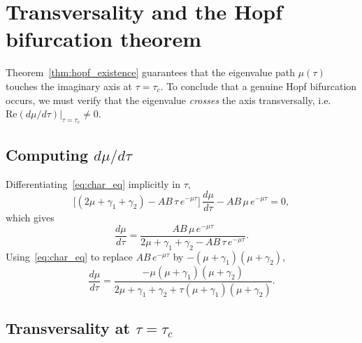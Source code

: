 \documentclass[sn-mathphys,Numbered]{sn-jnl}
\theoremstyle{thmstyleone}
\theoremstyle{thmstyletwo}
\theoremstyle{thmstylethree}
\begin{document}
\section{Transversality and the Hopf bifurcation theorem}
\label{sec:transversality}

Theorem~\ref{thm:hopf_existence} guarantees that the eigenvalue path
$\mu(\tau)$ touches the imaginary axis at $\tau=\tau_c$. To conclude that a
genuine Hopf bifurcation occurs, we must verify that the eigenvalue
\emph{crosses} the axis transversally, i.e.\
$\mathrm{Re}(d\mu/d\tau)|_{\tau=\tau_c}\neq 0$.

\subsection{Computing $d\mu/d\tau$}

Differentiating~\eqref{eq:char_eq} implicitly in $\tau$,
\[
\bigl[(2\mu+\gamma_1+\gamma_2) - AB\,\tau\,e^{-\mu\tau}\bigr]\,\frac{d\mu}{d\tau}
- AB\,\mu\,e^{-\mu\tau} = 0,
\]
which gives
\[
\frac{d\mu}{d\tau}
= \frac{AB\,\mu\,e^{-\mu\tau}}{2\mu+\gamma_1+\gamma_2 - AB\,\tau\,e^{-\mu\tau}}.
\]
Using~\eqref{eq:char_eq} to replace $AB\,e^{-\mu\tau}$ by
$-(\mu+\gamma_1)(\mu+\gamma_2)$,
\begin{equation}
\frac{d\mu}{d\tau}
= \frac{-\mu(\mu+\gamma_1)(\mu+\gamma_2)}
       {2\mu+\gamma_1+\gamma_2 + \tau(\mu+\gamma_1)(\mu+\gamma_2)}.
\label{eq:dmu_dtau}
\end{equation}

\subsection{Transversality at $\tau=\tau_c$}
\end{document}
